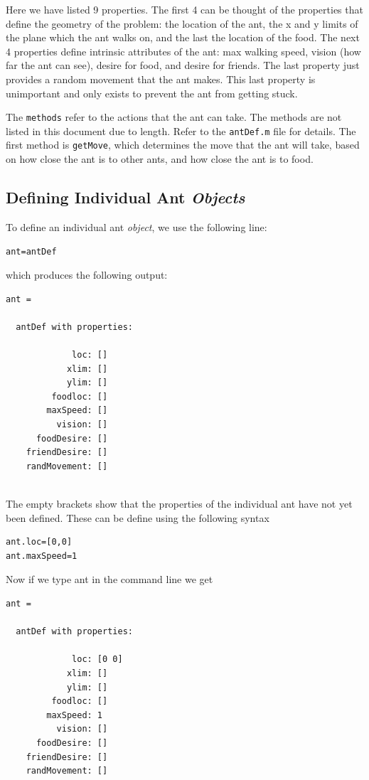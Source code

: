 \documentclass[12pt]{article}
\begin{document}
Here we have listed 9 properties. The first 4 can be thought of the properties that define the geometry of the problem: the location of the ant, the x and y limits of the plane which the ant walks on, and the last the location of the food. The next 4 properties define intrinsic attributes of the ant: max walking speed, vision (how far the ant can see), desire for food, and desire for friends. The last property just provides a random movement that the ant makes. This last property is unimportant and only exists to prevent the ant from getting stuck.

The \lstinline|methods| refer to the actions that the ant can take. The methods are not listed in this document due to length. Refer to the \lstinline|antDef.m| file for details. The first method is \lstinline|getMove|, which determines the move that the ant will take, based on how close the ant is to other ants, and how close the ant is to food.

\subsection{Defining Individual Ant  \textit{Objects}}

To define an individual ant \textit{object}, we use the following line:

\begin{lstlisting}[frame=single]
ant=antDef
\end{lstlisting}

which produces the following output:

\begin{lstlisting}[frame=single]
ant = 

  antDef with properties:

             loc: []
            xlim: []
            ylim: []
         foodloc: []
        maxSpeed: []
          vision: []
      foodDesire: []
    friendDesire: []
    randMovement: []
        
\end{lstlisting}

The empty brackets show that the properties of the individual ant have not yet been defined. These can be define using the following syntax
\begin{lstlisting}[frame=single]
ant.loc=[0,0]
ant.maxSpeed=1
\end{lstlisting}

Now if we type ant in the command line we get 
\begin{lstlisting}[frame=single]
ant = 

  antDef with properties:

             loc: [0 0]
            xlim: []
            ylim: []
         foodloc: []
        maxSpeed: 1
          vision: []
      foodDesire: []
    friendDesire: []
    randMovement: []

\end{lstlisting}
\end{document}
